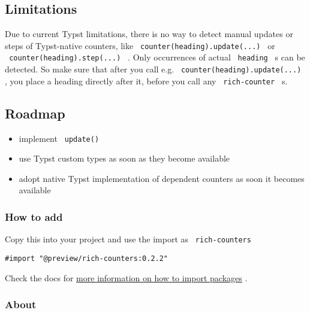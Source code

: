 \subsection{Limitations}\label{limitations}

Due to current Typst limitations, there is no way to detect manual
updates or steps of Typst-native counters, like
\texttt{\ counter(heading).update(...)\ } or
\texttt{\ counter(heading).step(...)\ } . Only occurrences of actual
\texttt{\ heading\ } s can be detected. So make sure that after you call
e.g. \texttt{\ counter(heading).update(...)\ } , you place a heading
directly after it, before you call any \texttt{\ rich-counter\ } s.

\subsection{Roadmap}\label{roadmap}

\begin{itemize}
\tightlist
\item
  implement \texttt{\ update()\ }
\item
  use Typst custom types as soon as they become available
\item
  adopt native Typst implementation of dependent counters as soon it
  becomes available
\end{itemize}

\subsubsection{How to add}\label{how-to-add}

Copy this into your project and use the import as
\texttt{\ rich-counters\ }

\begin{verbatim}
#import "@preview/rich-counters:0.2.2"
\end{verbatim}



Check the docs for
\href{https://typst.app/docs/reference/scripting/\#packages}{more
information on how to import packages} .

\subsubsection{About}\label{about}

